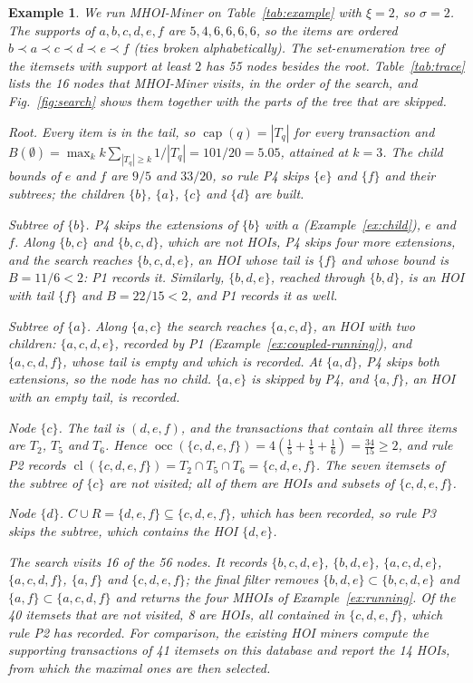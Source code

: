 \documentclass[pdflatex,sn-mathphys,Numbered]{sn-jnl}
\theoremstyle{thmstyleone}
\theoremstyle{thmstyletwo}
\newtheorem{example}{Example}
\theoremstyle{thmstylethree}
\newcommand{\occ}{\operatorname{occ}}
\newcommand{\cl}{\operatorname{cl}}
\newcommand{\capa}{\operatorname{cap}}
\newcommand{\Algo}{MHOI-Miner}
\begin{document}
\begin{example}\label{ex:search}
We run \Algo{} on Table~\ref{tab:example} with $\xi = 2$, so $\sigma = 2$. The supports of $a, b, c, d, e, f$ are $5, 4, 6, 6, 6, 6$, so the items are ordered $b \prec a \prec c \prec d \prec e \prec f$ (ties broken alphabetically). The set-enumeration tree of the itemsets with support at least $2$ has 55 nodes besides the root. Table~\ref{tab:trace} lists the 16 nodes that \Algo{} visits, in the order of the search, and Fig.~\ref{fig:search} shows them together with the parts of the tree that are skipped.

\emph{Root.} Every item is in the tail, so $\capa(q) = |T_q|$ for every transaction and $B(\emptyset) = \max_k k \sum_{|T_q| \ge k} 1/|T_q| = 101/20 = 5.05$, attained at $k = 3$. The child bounds of $e$ and $f$ are $9/5$ and $33/20$, so rule P4 skips $\{e\}$ and $\{f\}$ and their subtrees; the children $\{b\}$, $\{a\}$, $\{c\}$ and $\{d\}$ are built.

\emph{Subtree of $\{b\}$.} P4 skips the extensions of $\{b\}$ with $a$ (Example~\ref{ex:child}), $e$ and $f$. Along $\{b,c\}$ and $\{b,c,d\}$, which are not HOIs, P4 skips four more extensions, and the search reaches $\{b,c,d,e\}$, an HOI whose tail is $\{f\}$ and whose bound is $B = 11/6 < 2$: P1 records it. Similarly, $\{b,d,e\}$, reached through $\{b,d\}$, is an HOI with tail $\{f\}$ and $B = 22/15 < 2$, and P1 records it as well.

\emph{Subtree of $\{a\}$.} Along $\{a,c\}$ the search reaches $\{a,c,d\}$, an HOI with two children: $\{a,c,d,e\}$, recorded by P1 (Example~\ref{ex:coupled-running}), and $\{a,c,d,f\}$, whose tail is empty and which is recorded. At $\{a,d\}$, P4 skips both extensions, so the node has no child. $\{a,e\}$ is skipped by P4, and $\{a,f\}$, an HOI with an empty tail, is recorded.

\emph{Node $\{c\}$.} The tail is $(d, e, f)$, and the transactions that contain all three items are $T_2$, $T_5$ and $T_6$. Hence $\occ(\{c,d,e,f\}) = 4 \left(\frac15 + \frac15 + \frac16\right) = \frac{34}{15} \ge 2$, and rule P2 records $\cl(\{c,d,e,f\}) = T_2 \cap T_5 \cap T_6 = \{c,d,e,f\}$. The seven itemsets of the subtree of $\{c\}$ are not visited; all of them are HOIs and subsets of $\{c,d,e,f\}$.

\emph{Node $\{d\}$.} $C \cup R = \{d,e,f\} \subseteq \{c,d,e,f\}$, which has been recorded, so rule P3 skips the subtree, which contains the HOI $\{d,e\}$.

The search visits 16 of the 56 nodes. It records $\{b,c,d,e\}$, $\{b,d,e\}$, $\{a,c,d,e\}$, $\{a,c,d,f\}$, $\{a,f\}$ and $\{c,d,e,f\}$; the final filter removes $\{b,d,e\} \subset \{b,c,d,e\}$ and $\{a,f\} \subset \{a,c,d,f\}$ and returns the four MHOIs of Example~\ref{ex:running}. Of the 40 itemsets that are not visited, 8 are HOIs, all contained in $\{c,d,e,f\}$, which rule P2 has recorded. For comparison, the existing HOI miners \cite{deng2020hoi,nguyen2023dfhoi} compute the supporting transactions of 41 itemsets on this database and report the 14 HOIs, from which the maximal ones are then selected.
\end{example}
\end{document}
